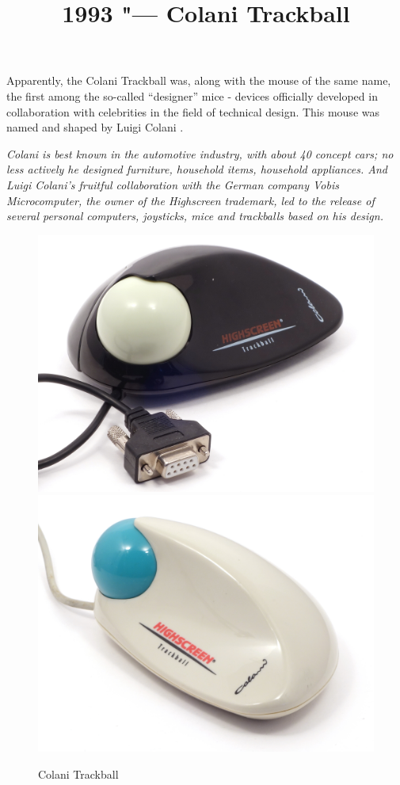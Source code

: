 \documentclass[11pt, a4paper]{article}
\begin{document}
\title{1993 "--- Colani Trackball}
\date{}
\maketitle
{}
Apparently, the  Colani Trackball was, along with the mouse of the same name, the first among the so-called “designer” mice - devices officially developed in collaboration with celebrities in the field of technical design. This mouse was named and shaped by Luigi Colani \cite{wiki}.

\textit{Colani is best known in the automotive industry, with about 40 concept cars; no less actively he designed furniture, household items, household appliances. And Luigi Colani's fruitful collaboration with the German company Vobis Microcomputer, the owner of the Highscreen trademark, led to the release of several personal computers, joysticks, mice and trackballs based on his design.}

\begin{figure}[h]
    \centering
    \includegraphics[scale=0.475]{1993_colani_trackball/pic_b_60.jpg}
    \includegraphics[scale=0.475]{1993_colani_trackball/pic_w_60.jpg}
    \caption{Colani Trackball}
    \label{fig:ColaniPic}
\end{figure}
\end{document}
